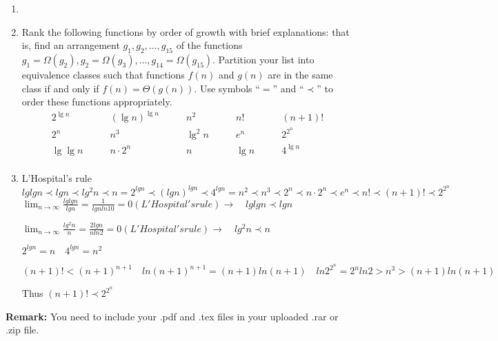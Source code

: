 \documentclass[12pt,a4paper]{article}
\makeatletter
\newtheorem*{solution}{Solution}
\theoremstyle{definition}
\renewenvironment{solution}[1][Solution] {\par\pushQED{\qed}\normalfont\topsep6\p@\@plus6\p@\relax\trivlist\item[\hskip\labelsep\bfseries#1\@addpunct{.}]\ignorespaces}{\popQED\endtrivlist\@endpefalse} \makeatother
\makeatother
\begin{document}
\begin{enumerate}
\begin{solution}
    \end{solution}

    \item

    Rank the following functions by order of growth with brief explanations: that is, find an arrangement $g_1, g_2, \ldots , g_{15}$ of the functions $g_1 = \Omega(g_2), g_2 = \Omega(g_3), \ldots, g_{14} = \Omega(g_{15})$.  Partition your list into equivalence classes such that functions $f(n)$ and $g(n)$ are in the same class if and only if $f(n) = \Theta(g(n))$. Use symbols ``$=$'' and ``$\prec$'' to order these functions appropriately.
    $$
    \begin{array}{ccccc}
        2^{\lg n} \quad & \quad (\lg n)^{\lg n} \quad & \quad n^2 \quad & \quad n! \quad & \quad (n + 1)! \\
        2^n \quad & \quad n^3 \quad & \quad \lg^2 n \quad & \quad e^n \quad & \quad 2^{2^n} \\
        \lg\lg n \quad & \quad n\cdot 2^n \quad & \quad n \quad & \quad \lg n \quad & \quad 4^{\lg n} \\
    \end{array}
    $$

    \begin{solution} L'Hospital's rule
        $$lglgn\prec lgn \prec lg^2n\prec n = 2^{lgn}\prec (lgn)^{lgn}\prec 4^{lgn}= n^2 \prec n^3  \prec 2^n \prec n\cdot 2^n\prec e^n \prec n! \prec (n+1)!\prec 2^{2^{n}}$$
    $\lim_{n \to \infty} \frac{lglgn}{lgn}=\frac{1}{lgnln10}=0(L'Hospital's rule) \rightarrow \quad lglgn\prec lgn$

    $\lim_{n \to \infty} \frac{lg^2n}{n}=\frac{2lgn}{nln2}=0(L'Hospital's rule) \rightarrow \quad lg^2n\prec n$

    $2^{lgn}=n \quad 4^{lgn}=n^2$

    $(n+1)!<(n+1)^{n+1}\quad ln(n+1)^{n+1}=(n+1)ln(n+1) \quad ln2^{2^{n}}=2^nln2>n^3>(n+1)ln(n+1) $

    Thus $(n+1)!\prec 2^{2^{n}}$
    
        
  
    \end{solution}

\end{enumerate}

\vspace{20pt}

\textbf{Remark:} You need to include your .pdf and .tex files in your uploaded .rar or .zip file.

\end{document}
